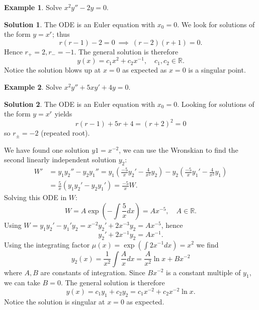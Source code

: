 \documentclass{article}
\theoremstyle{plain}
\theoremstyle{definition}
\newtheorem{exmp}{Example}[section]
\newtheorem*{sol}{Solution}
\numberwithin{equation}{section}
\begin{document}
\begin{tcolorbox}
    \begin{exmp}
        Solve $x^2y''-2y=0$.
    \end{exmp}
    \begin{sol}
        The ODE is an Euler equation with $x_0=0$. We look for solutions of the form $y=x^r$; thus
        \[
        r(r-1) - 2=0 \ \implies \ (r-2)(r+1)=0.
        \]
        Hence $r_+=2, r_-=-1$. The general solution is therefore
        \[
        y(x) = c_1x^2 + c_2x^{-1}, \quad c_1,c_2 \in \mathbb{R}.
        \]
        Notice the solution blows up at $x=0$ as expected as $x=0$ is a singular point.
    \end{sol}
\end{tcolorbox}

\begin{tcolorbox}
    \begin{exmp}
        Solve $x^2y'' + 5xy' + 4y = 0$.
    \end{exmp}
    \begin{sol}
        The ODE is an Euler equation with $x_0=0$. Looking for solutions of the form $y=x^r$ yields
        \[
        r(r-1) + 5r + 4 = (r+2)^2 = 0
        \]
        so $r_\pm=-2$ (repeated root).

        We have found one solution $y1=x^{-2}$, we can use the Wronskian to find the second linearly independent solution $y_2$:
        \begin{align*}
        W' &= y_1y_2'' - y_2y_1'' = y_1\left(\frac{-5}{x}y_2'-\frac{4}{x^2}y_2\right) - y_2\left(\frac{-5}{x}y_1'-\frac{4}{x^2}y_1 \right)\\
        &= \frac{5}{x}(y_1y_2' - y_2y_1') = \frac{-5}{x}W.
        \end{align*}
        Solving this ODE in $W$:
        \[
        W = A \exp\left(-\int \frac{5}{x} dx \right) = A x^{-5}, \quad A \in \mathbb{R}.
        \]
        Using $W=y_1y_2' - y_1'y_2 = x^{-2}y_2' + 2x^{-3}y_2 = Ax^{-5}$, hence
        \[
        y_2' + 2x^{-1}y_2 = Ax^{-1}.
        \]
        Using the integrating factor $\mu(x) = \exp\left(\int2x^{-1} dx \right) = x^2$ we find
        \[
        y_2(x) = \frac{1}{x^2}\int \frac{A}{x} dx = \frac{A}{x^2}\ln x + Bx^{-2}
        \]
        where $A,B$ are constants of integration. Since $Bx^{-2}$ is a constant multiple of $y_1$, we can take $B=0$. The general solution is therefore
        \[
        y(x) = c_1y_1 + c_2y_2 = c_1x^{-2} + c_2x^{-2}\ln x.
        \]
        Notice the solution is singular at $x=0$ as expected.
    \end{sol}
\end{tcolorbox}
\end{document}
